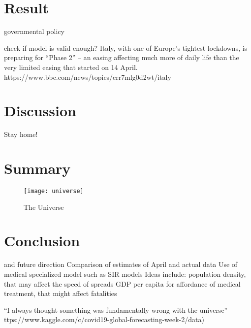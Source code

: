 \documentclass{article}
\begin{document}
\section{Result}

governmental policy

check if model is valid enough?
Italy, with one of Europe’s tightest lockdowns, is preparing for “Phase 2” – an easing affecting much more of daily life than the very limited easing that started on 14 April.
https://www.bbc.com/news/topics/crr7mlg0d2wt/italy

\section{Discussion}
Stay home!

\section{Summary}

\begin{figure}[h!]
\centering
\texttt{[image: universe]}
\caption{The Universe}
\label{fig:universe}
\end{figure}

\section{Conclusion}

and future direction
Comparison of estimates of April and actual data
Use of medical specialized model such as SIR models
Ideas include:
population density, that may affect the speed of spreads
GDP per capita for affordance of medical treatment, that might affect fatalities



``I always thought something was fundamentally wrong with the universe'' \citep{adams1995hitchhiker}ttps://www.kaggle.com/c/covid19-global-forecasting-week-2/data)


\end{document}
